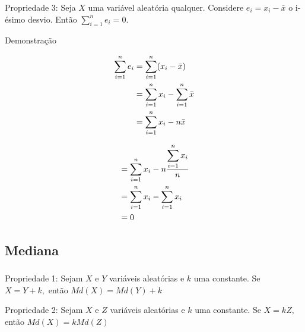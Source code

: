 \documentclass[14pt,aspectratio=1610]{beamer}
\begin{document}
\begin{frame}{}
\frametitle{}
\begin{block}{Propriedade 3:}
\justifying
Seja $X$ uma variável aleatória qualquer. Considere $e_{i}=x_{i}-\bar{x}$ o i-ésimo desvio. Então $\sum_{i=1}^{n}e_{i}=0.$
\end{block}
\pause
\begin{block}{Demonstração}
\begin{minipage}{0.4\textwidth}
\begin{align*}
{\displaystyle \sum_{i=1}^{n}e_{i}}&=
{\displaystyle \sum_{i=1}^{n}(x_{i}-\bar{x})}\\ 
\vspace{0.1cm}
       &={\displaystyle \sum_{i=1}^{n}x_{i}-\sum_{i=1}^{n}\bar{x}}\\ \vspace{0.1cm}
       &={\displaystyle \sum_{i=1}^{n}x_{i}}-n\bar{x}\\
\end{align*}
\end{minipage}\pause\hfill
\begin{minipage}{0.4\textwidth}
\begin{align*}
&={\displaystyle \sum_{i=1}^{n}x_{i}}-n \dfrac{{\displaystyle\sum_{i=1}^{n}x_{i}}}{n}\\ \vspace{0.1cm}
&={\displaystyle \sum_{i=1}^{n}x_{i}}- {\displaystyle\sum_{i=1}^{n}x_{i}}\\ \vspace{0.1cm}
&=0\\
\end{align*}
\end{minipage}
\end{block}
\end{frame}

\subsection{Mediana}
\begin{frame}{}
\frametitle{}
\begin{block}{Propriedade 1:}
\justifying
Sejam $X$ e $Y$ variáveis aleatórias e $k$ uma constante. Se $X=Y+k,$ então $Md(X)=Md(Y)+k$
\end{block}
\pause
\begin{block}{Propriedade 2:}
\justifying
Sejam $X$ e $Z$ variáveis aleatórias e $k$ uma constante. Se $X=kZ,$ então $Md(X)=kMd(Z)$
\end{block}
\end{frame}
\end{document}
